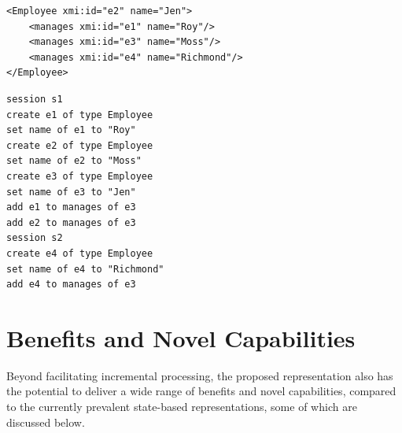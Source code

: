 \documentclass{llncs}
\begin{document}
\begin{lstlisting}[style=xmi,caption={State-based representation of the model of Figure \ref{image2} in (simplified) XMI.},label=xmimodel]
<Employee xmi:id="e2" name="Jen">
    <manages xmi:id="e1" name="Roy"/>
    <manages xmi:id="e3" name="Moss"/>
    <manages xmi:id="e4" name="Richmond"/>
</Employee>
\end{lstlisting}

\begin{lstlisting}[style=cbp,caption={Proposed change-based representation of the model of Figure \ref{image2}.},label=cbpmodel1]
session s1
create e1 of type Employee
set name of e1 to "Roy"
create e2 of type Employee
set name of e2 to "Moss"
create e3 of type Employee
set name of e3 to "Jen"
add e1 to manages of e3
add e2 to manages of e3
session s2
create e4 of type Employee
set name of e4 to "Richmond"
add e4 to manages of e3
\end{lstlisting}

\section{Benefits and Novel Capabilities}
\label{Benefits and Novel Capabilities}
Beyond facilitating incremental processing, the proposed representation also has the potential to deliver a wide range of benefits and novel capabilities, compared to the currently prevalent state-based representations, some of which are discussed below.
\end{document}
